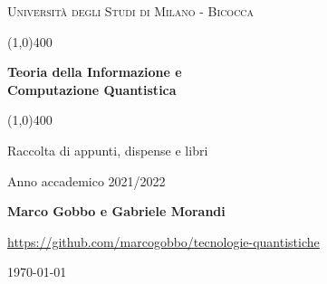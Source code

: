 \documentclass[a4paper, 12pt]{book}
\numberwithin{equation}{section}
\numberwithin{figure}{chapter}
\begin{document}
    \begin{titlepage}
        \begin{center}
            \vspace*{3cm}
            {\scshape\LARGE Università degli Studi di Milano - Bicocca \par}
            \vspace{1.0cm}
            \line(1,0){400} \\
            {\huge\bfseries Teoria della Informazione e \\ Computazione Quantistica \par}
            \line(1,0){400} \\
 	        \vspace{1.0cm}
            {\Large Raccolta di appunti, dispense e libri \par}
            \vspace{1.0cm}
            {Anno accademico 2021/2022 \par}
            \vspace{0.5cm}
            {\bfseries Marco Gobbo e Gabriele Morandi \par}
            \vspace{0.5cm}
            {\url{https://github.com/marcogobbo/tecnologie-quantistiche} \par}
            \vspace*{\fill}
            {\large \today \par}
        \end{center}
    \end{titlepage}
    \tableofcontents
    
    
    
    
    
    
    
    
    
    
    
    
    
    
    
    
    
    
    
    
    
    
\end{document}
